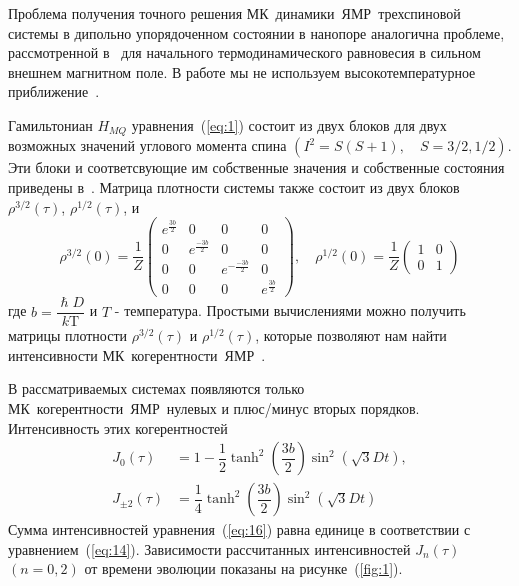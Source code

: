 \documentclass[utf8]{jetp}
\begin{document}
Проблема получения точного решения МК~динамики~ЯМР~трехспиновой системы в дипольно упорядоченном состоянии в нанопоре аналогична проблеме, рассмотренной в~\cite{Doronin_2019} для начального термодинамического равновесия в сильном внешнем магнитном поле.
В работе мы не используем высокотемпературное приближение~\cite{Goldman_1970}.

Гамильтониан $H_{MQ}$ уравнения~(\ref{eq:1}) состоит из двух блоков для двух возможных значений углового момента спина $(I^2 = S(S+1), \quad S=3/2,1/2)$.
Эти блоки и соответсвующие им собственные значения и собственные состояния приведены в~\cite{Doronin_2019}.
Матрица плотности системы также состоит из двух блоков $\rho^{3/2}(\tau)$, $\rho^{1/2}(\tau)$, и
%
\begin{equation}
  \label{eq:15}
  \rho^{3/2}(0) = \dfrac 1 Z
  \begin{pmatrix}
    e^{\frac{3b}{2}} & 0 & 0 & 0
    \\
    0 & e^{\frac{-3b}{2}} & 0 & 0
    \\
    0 & 0 & e^{-\frac{-3b}{2}} & 0
    \\
    0 & 0 & 0 & e^{\frac{3b}{2}}
  \end{pmatrix},
  \quad
  \rho^{1/2}(0) = \dfrac 1 Z
  \begin{pmatrix}
    	1 & 0
    \\
    0 & 1
  \end{pmatrix}
\end{equation}
%
где $b = \dfrac{\hslash D}{k\mathrm{T}}$ и $T$ - температура.
Простыми вычислениями можно получить матрицы плотности $\rho^{3/2}(\tau)$ и $\rho^{1/2}(\tau)$,
которые позволяют нам найти интенсивности МК~когерентности~ЯМР~.

В рассматриваемых системах появляются только МК~когерентности~ЯМР~нулевых и плюс/минус вторых порядков.
Интенсивность этих когерентностей
%
\begin{equation}
  \begin{split}
    \label{eq:16}
    J_0(\tau) & = 1
    - \dfrac 1 2 \tanh^2\left( \dfrac{3b}{2} \right)
      \sin^2 \left( \sqrt{3} Dt \right),
    \\
    J_{\pm2}(\tau) & = \dfrac{1}{4}
      \tanh^2 \left( \dfrac{3b}{2} \right)
      \sin^2 \left( \sqrt{3} Dt \right)
  \end{split}
\end{equation}
%
Сумма интенсивностей уравнения~(\ref{eq:16}) равна единице в соответствии с уравнением~(\ref{eq:14}).
Зависимости рассчитанных интенсивностей $J_{n}(\tau)$ $(n=0,2)$ от времени эволюции показаны на рисунке~(\ref{fig:1}).
\end{document}
